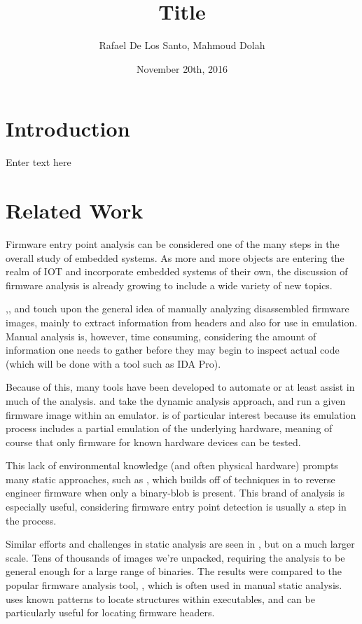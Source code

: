 \documentclass{article}
\title{Title}
\author{Rafael De Los Santo, Mahmoud Dolah}
\date{November 20th, 2016}
\begin{document}
\maketitle
\section{Introduction}
Enter text here

\section{Related Work}
Firmware entry point analysis can be considered one of the many steps in the overall study of embedded systems. As more and more objects are entering the realm of IOT and incorporate embedded systems of their own, the discussion of firmware analysis is already growing to include a wide variety of new topics. 

\cite{fitnesstrackers2016},\cite{cloudscale2013}, and \cite{securityfirmwarereverse2013} touch upon the general idea of manually analyzing disassembled firmware images, mainly to extract information from headers and also for use in emulation. Manual analysis is, however, time consuming, considering the amount of information one needs to gather before they may begin to inspect actual code (which will be done with a tool such as IDA Pro). 

Because of this, many tools have been developed to automate or at least assist in much of the analysis. \cite{avatar} and \cite{dynamicanalysisatscale2015} take the dynamic analysis approach, and run a given firmware image within an emulator. \cite{dynamicanalysisatscale2015} is of particular interest because its emulation process includes a partial emulation of the underlying hardware, meaning of course that only firmware for known hardware devices can be tested.

This lack of environmental knowledge (and often physical hardware) prompts many static approaches, such as \cite{firmalice2015}, which builds off of techniques in \cite{staticdisassembly2002} to reverse engineer firmware when only a binary-blob is present. This brand of analysis is especially useful, considering firmware entry point detection is usually a step in the process. 

Similar efforts and challenges in static analysis are seen in \cite{analysisofembeddedfirmware2014}, but on a much larger scale. Tens of thousands of images we’re unpacked, requiring the analysis to be general enough for a large range of binaries. The results were compared to the popular firmware analysis tool, \cite{binwalk}, which is often used in manual static analysis. \cite{binwalk} uses known patterns to locate structures within executables, and can be particularly useful for locating firmware headers.
\end{document}
